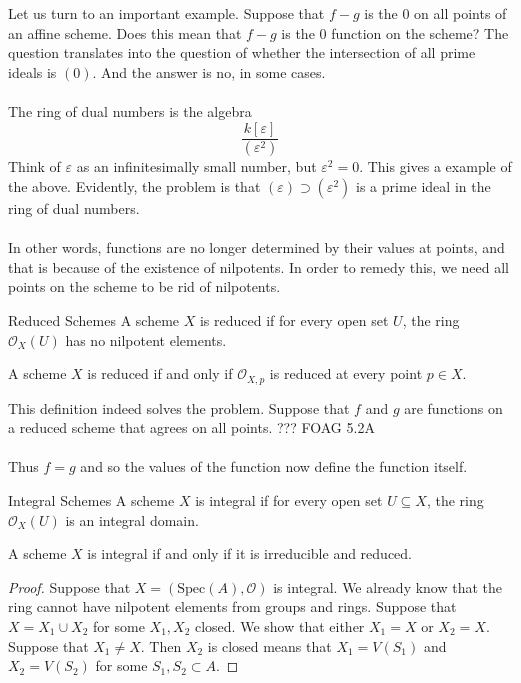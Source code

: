 \documentclass[a4paper]{article}
\begin{document}
Let us turn to an important example. Suppose that $f-g$ is the $0$ on all points of an affine scheme. Does this mean that $f-g$ is the $0$ function on the scheme? The question translates into the question of whether the intersection of all prime ideals is $(0)$. And the answer is no, in some cases. \\~\\

The ring of dual numbers is the algebra $$\frac{k[\varepsilon]}{(\varepsilon^2)}$$ Think of $\varepsilon$ as an infinitesimally small number, but $\varepsilon^2=0$. This gives a example of the above. Evidently, the problem is that $(\varepsilon)\supset(\varepsilon^2)$ is a prime ideal in the ring of dual numbers. \\~\\

In other words, functions are no longer determined by their values at points, and that is because of the existence of nilpotents. In order to remedy this, we need all points on the scheme to be rid of nilpotents. 

\begin{defn}{Reduced Schemes}{} A scheme $X$ is reduced if for every open set $U$, the ring $\mathcal{O}_X(U)$ has no nilpotent elements. 
\end{defn}

\begin{prp}{}{} A scheme $X$ is reduced if and only if $\mathcal{O}_{X,p}$ is reduced at every point $p\in X$. 
\end{prp}

This definition indeed solves the problem. Suppose that $f$ and $g$ are functions on a reduced scheme that agrees on all points. ??? FOAG 5.2A\\~\\
Thus $f=g$ and so the values of the function now define the function itself. 

\begin{defn}{Integral Schemes}{} A scheme $X$ is integral if for every open set $U\subseteq X$, the ring $\mathcal{O}_X(U)$ is an integral domain. 
\end{defn}

\begin{prp}{}{} A scheme $X$ is integral if and only if it is irreducible and reduced. \tcbline
\begin{proof}
Suppose that $X=(\text{Spec}(A),\mathcal{O})$ is integral. We already know that the ring cannot have nilpotent elements from groups and rings. Suppose that $X=X_1\cup X_2$ for some $X_1,X_2$ closed. We show that either $X_1=X$ or $X_2=X$. Suppose that $X_1\neq X$. Then $X_2$ is closed means that $X_1=V(S_1)$ and $X_2=V(S_2)$ for some $S_1,S_2\subset A$. 
\end{proof}
\end{prp}
\end{document}
